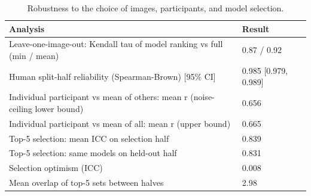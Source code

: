 \begin{table}
\caption{Robustness to the choice of images, participants, and model selection.}
\begin{tabular}{ll}
\toprule
Analysis & Result \\
\midrule
Leave-one-image-out: Kendall tau of model ranking vs full (min / mean) & 0.87 / 0.92 \\
Human split-half reliability (Spearman-Brown) [95\% CI] & 0.985 [0.979, 0.989] \\
Individual participant vs mean of others: mean r (noise-ceiling lower bound) & 0.656 \\
Individual participant vs mean of all: mean r (upper bound) & 0.665 \\
Top-5 selection: mean ICC on selection half & 0.839 \\
Top-5 selection: same models on held-out half & 0.831 \\
Selection optimism (ICC) & 0.008 \\
Mean overlap of top-5 sets between halves & 2.98 \\
\bottomrule
\end{tabular}
\end{table}
